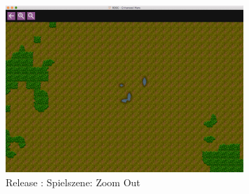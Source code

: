\documentclass[12pt, titlepage]{scrartcl}
\newcommand{\RN}[1]{%
	\textup{\uppercase\expandafter{\romannumeral#1}}%
}
\begin{document}
			    \begin{figure}[H] 
    				\centering
    				\includegraphics[width=0.8\textwidth]{images/old_state/ingame/ZoomOut.png}
    				\caption{Release \RN{2}: Spielszene: Zoom Out}
    				\label{Ingame_Out}
			    \end{figure}
	\newpage
\end{document}

